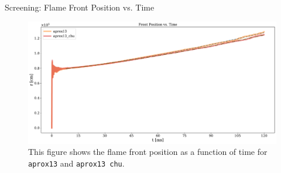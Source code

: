 \documentclass[
	11pt, %
]{beamer}
\begin{document}
\begin{frame}{Screening: Flame Front Position vs. Time}

    \begin{figure}
        \centering
        \includegraphics[width=1\linewidth]{screen_front.pdf}
        \caption{This figure shows the flame front position as a function of time for {\tt aprox13} and {\tt aprox13 chu}.}
    \end{figure}
\end{frame}
\end{document}
